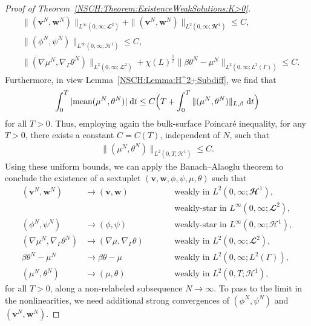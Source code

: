 \documentclass[11pt,reqno]{amsart}
\theoremstyle{remark}
\numberwithin{equation}{section}
\newcommand{\abs}[1]{|#1|}
\newcommand{\norm}[1]{\| #1 \|}
\newcommand{\mean}[2]{\textnormal{mean}(#1,#2)}
\newcommand{\dt}{\;\mathrm dt}
\newcommand{\Grad}{\nabla}
\newcommand{\Gradg}{\nabla_\Ga}
\newcommand{\Ga}{\Gamma}
\newcommand{\bv}{\mathbf v}
\newcommand{\bw}{\mathbf w}
\begin{document}
\begin{proof}[Proof of Theorem~\ref{NSCH:Theorem:ExistenceWeakSolutions:K>0}]
    \begin{align}
    	&\norm{(\bv^N,\bw^N)}_{L^\infty(0,\infty;\mathbfcal{L}^2)} + \norm{(\bv^N,\bw^N)}_{L^2(0,\infty;\mathbfcal{H}^1)} \leq C, \label{NSCH:Est:vw:Uniform:N:1} \\
    	&\norm{(\phi^N,\psi^N)}_{L^\infty(0,\infty;\mathcal{H}^1)} \leq C, \label{NSCH:Est:pp:Uniform:N:1} \\
    	&\norm{(\Grad\mu^N,\Gradg\theta^N)}_{L^2(0,\infty;\mathbfcal{L}^2)} + \chi(L)^{\frac12}\norm{\beta\theta^N-\mu^N}_{L^2(0,\infty;L^2(\Ga))} \leq C. \label{NSCH:Est:mt:Uniform:N:1}
	\end{align}
    Furthermore, in view Lemma~\ref{NSCH:Lemma:H^2+Subdiff}, we find that
    \begin{align*}
        \int_0^T\abs{\mean{\mu^N}{\theta^N}}\dt \leq C\Big(T + \int_0^T \norm{(\mu^N,\theta^N)}_{L,\beta}\dt\Big)
    \end{align*}
    for all $T > 0$. Thus, employing again the bulk-surface Poincar\'{e} inequality, for any $T > 0$, there exists a constant $C = C(T)$, independent of $N$, such that
    \begin{align}\label{NSCH:Est:mt:Uniform:N:2}
        \norm{(\mu^N,\theta^N)}_{L^2(0,T;\mathcal{H}^1)} \leq C .
    \end{align}
    Using these uniform bounds, we can apply the Banach--Alaoglu theorem to conclude the existence of a sextuplet $(\bv,\bw,\phi,\psi,\mu,\theta)$ such that
    \begin{subequations}
    \begin{alignat}{2}
        (\bv^N,\bw^N) &\rightarrow (\bv,\bw) &&\qquad\text{weakly in~} L^2(0,\infty;\mathbfcal{H}^1), \label{NSCH:Conv:vw:Weakly} \\
        & &&\qquad\text{weakly-star in~} L^\infty(0,\infty;\mathbfcal{L}^2), \\
        (\phi^N,\psi^N) &\rightarrow (\phi,\psi) &&\qquad\text{weakly-star in~} L^\infty(0,\infty;\mathcal{H}^1), \label{NSCH:Conv:pp:Weakly} \\
        (\Grad\mu^N,\Gradg\theta^N) &\rightarrow (\Grad\mu,\Gradg\theta) &&\qquad\text{weakly in~} L^2(0,\infty;\mathbfcal{L}^2), \\
        \beta\theta^N - \mu^N &\rightarrow \beta\theta - \mu &&\qquad\text{weakly in~} L^2(0,\infty; L^2(\Ga)), \label{NSCH:Conv:bt-m:Weakly} \\
        (\mu^N,\theta^N) &\rightarrow (\mu,\theta) &&\qquad\text{weakly in~} L^2(0,T;\mathcal{H}^1), \label{NSCH:Conv:mt:Weakly}
    \end{alignat}
    \end{subequations}
    for all $T > 0$, along a non-relabeled subsequence $N\rightarrow\infty$. To pass to the limit in the nonlinearities, we need additional strong convergences of $(\phi^N,\psi^N)$ and $(\bv^N,\bw^N)$. 


\end{proof}
\end{document}
